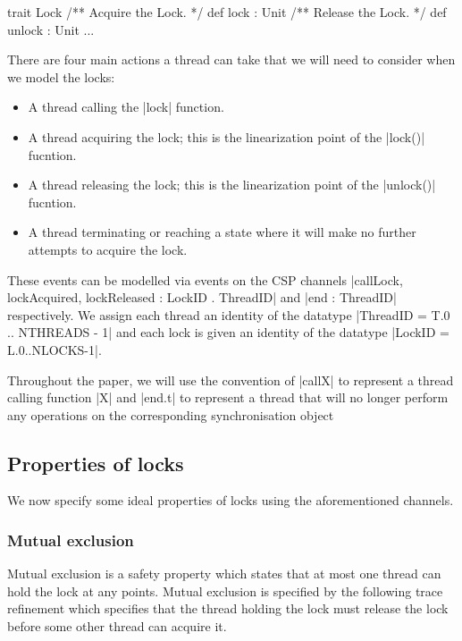 \begin{scala}[caption={A Scala interface for a simple lock},label={code:LockInterface}]
  trait Lock{
    /** Acquire the Lock. */
    def lock : Unit
    /** Release the Lock. */
    def unlock : Unit 
    ...
  }
\end{scala}



There are four main actions a thread can take that we will need to consider when we model the locks:

\begin{itemize}
  \item A thread calling the |lock| function.
  \item A thread acquiring the lock; this is the linearization point of the |lock()| fucntion.
  \item A thread releasing the lock; this is the linearization point of the |unlock()| fucntion.
  \item A thread terminating or reaching a state where it will make no further attempts to acquire the lock.
\end{itemize}

These events can be modelled via events on the CSP channels \newline |callLock, lockAcquired, lockReleased : LockID . ThreadID| and |end : ThreadID| respectively. We assign each thread an identity of the datatype |ThreadID = T.{0 .. NTHREADS - 1}| and each lock is given an identity of the datatype |LockID = L.{0..NLOCKS-1}|.

Throughout the paper, we will use the convention of |callX| to represent a thread calling function |X| and |end.t| to represent a thread that will no longer perform any operations on the corresponding synchronisation object 

\subsection{Properties of locks}\label{section:lock-properties}

We now specify some ideal properties of locks using the aforementioned channels.

\subsubsection{Mutual exclusion}\label{mutual-exclusion}
Mutual exclusion is a safety property which states that at most one thread can hold the lock at any points. Mutual exclusion is specified by the following trace refinement which specifies that the thread holding the lock must release the lock before some other thread can acquire it.

